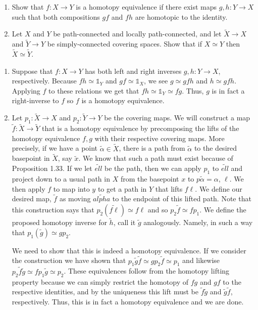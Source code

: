 \documentclass{article}
\begin{document}
\begin{problem}{3}{0cm}
  \vspace*{-\bigskipamount}
  \begin{enumerate}
  \item Show that $f: X \to Y$ is a homotopy equivalence if there
    exist maps $g,h: Y \to X$ such that both compositions $gf$ and
    $fh$ are homotopic to the identity.
  \item Let $X$ and $Y$ be path-connected and locally path-connected,
    and let $\tilde{X} \to X$ and $\tilde{Y} \to Y$ be
    simply-connected covering spaces. Show that if $X \simeq Y$ then
    $\tilde{X} \simeq \tilde{Y}$.
  \end{enumerate}
\end{problem}

\begin{solution}{0cm}
  \begin{enumerate}
  \item Suppose that $f: X \to Y$ has both left and right inverses
    $g,h: Y \to X$, respectively. Because $fh \simeq \mathbb{1}_Y$ and
    $gf \simeq \mathbb{1}_X$, we see $g \simeq gfh$ and $h \simeq
    gfh$. Applying $f$ to these relations we get that $fh \simeq
    \mathbb 1_Y \simeq fg$. Thus, $g$ is in fact a right-inverse to $f$
    so $f$ is a homotopy equivalence.
  \item Let $p_1: \tilde{X} \to X$ and $p_2: \tilde{Y} \to Y$ be the
    covering maps. We will construct a map $\tilde{f}: \tilde{X} \to
    \tilde{Y}$ that is a homotopy equivalence by precomposing the
    lifts of the homotopy equivalence $f,g$ with their respective
    covering maps. More precisely, if we have a point $\tilde{\alpha}
    \in \tilde{X}$, there is a path from $\tilde{\alpha}$ to the
    desired basepoint in $\tilde{X}$, say $\tilde{x}$. We know that
    such a path must exist because of Proposition 1.33. If we let
    $\tilde{ell}$ be the path, then we can apply $p_1$ to
    $\tilde{ell}$ and project down to a usual path in $X$ from the
    basepoint $x$ to $p{\tilde{\alpha}} = \alpha$, $\ell$. We then
    apply $f$ to map into $y$ to get a path in $Y$ that lifts
    $f\ell$. We define our desired map, $\tilde{f}$ as moving
    $\tilde{alpha}$ to the endpoint of this lifted path. Note that
    this construction says that $p_2(\tilde{f\ell}) \simeq f\ell$ and
    so $p_2 \tilde{f} \simeq fp_1$. We define the proposed homotopy
    inverse for $\tilde{h}$, call it $\tilde{g}$ analogously. Namely,
    in such a way that $p_1(\tilde{g}) \simeq gp_2$.

    We need to show that this is indeed a homotopy equivalence. If we
    consider the construction we have shown that
    $p_1\tilde{g}\tilde{f} \simeq gp_2\tilde{f} \simeq p_1$ and
    likewise $p_2\tilde{f}\tilde{g} \simeq fp_1\tilde{g} \simeq
    p_2$. These equivalences follow from the homotopy lifting property
    because we can simply restrict the homotopy of $fg$ and $gf$ to
    the respective identities, and by the uniqueness this lift must be
    $\tilde{f}\tilde{g}$ and $\tilde{g}\tilde{f}$, respectively.
    Thus, this is in fact a homotopy equivalence and we are done.
  \end{enumerate}
\end{solution}
\end{document}

